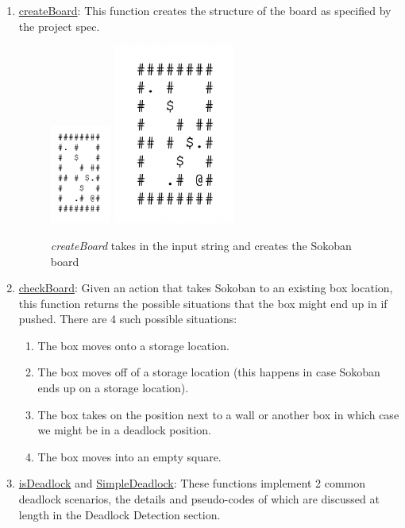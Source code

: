 \documentclass{article}
\begin{document}
\begin{enumerate}[label=\alph*)]
    \item \underline{createBoard}: This function creates the structure of the board as specified by the project spec. 
    \begin{figure}[htp]
        \centering
        \includegraphics[width=2cm]{Input.png}
        \includegraphics[width=4cm]{board.png}
        \caption{\emph{createBoard} takes in the input string and creates the Sokoban board}
    \end{figure} 
    \item \underline{checkBoard}: Given an action that takes Sokoban to an existing box location, this function returns the possible situations that the box might end up in if pushed. There are 4 such possible situations:
    
    \begin{enumerate}[label=\arabic*)]
        \item The box moves onto a storage location. 
        \item The box moves off of a storage location (this happens in case Sokoban ends up on a storage location).
        \item The box takes on the position next to a wall or another box in which case we might be in a deadlock position.
        \item The box moves into an empty square. 
    \end{enumerate}
    
    \item \underline{isDeadlock} and \underline{SimpleDeadlock}: These functions implement 2 common deadlock scenarios, the details and pseudo-codes of which are discussed at length in the Deadlock Detection section. 
\end{enumerate}
\end{document}
